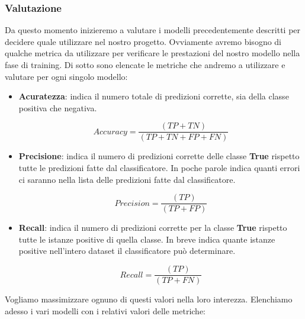 \documentclass[12pt]{article}
\begin{document}
\subsubsection{Valutazione}
Da questo momento inizieremo a valutare i modelli precedentemente descritti per decidere quale utilizzare nel nostro progetto.
Ovviamente avremo bisogno di qualche metrica da utilizzare per verificare le prestazioni del nostro modello nella fase di training. Di sotto sono elencate le metriche che andremo a utilizzare e valutare per ogni singolo modello:
\begin{itemize}
    \item \textbf{Acuratezza}: indica il numero totale di predizioni corrette, sia della classe positiva che negativa.\par \[\textit{Accuracy}=\frac{(TP + TN)}{(TP+TN+FP+FN)} \]
    \item \textbf{Precisione}: indica il numero di predizioni corrette delle classe \textbf{True} rispetto tutte le predizioni fatte dal classificatore. In poche parole indica quanti errori ci saranno nella lista delle predizioni fatte dal classificatore.\par \[\textit{Precision}=\frac{(TP)}{(TP+FP)} \]
    \item \textbf{Recall}: indica il numero di predizioni corrette per la classe \textbf{True} rispetto tutte le istanze positive di quella classe. In breve indica quante istanze positive nell'intero dataset il classificatore può determinare.\par \[\textit{Recall}=\frac{(TP)}{(TP+FN)} \]
\end{itemize}
Vogliamo massimizzare ognuno di questi valori nella loro interezza.
Elenchiamo adesso i vari modelli con i relativi valori delle metriche:
\end{document}
